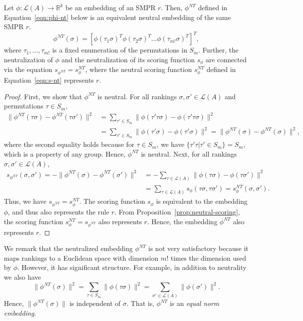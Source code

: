 \documentclass[prodmode,acmec]{ec-acmsmall}
\newcommand{\calL}{{\mathcal{L}}}
\newcommand{\rank}{{\calL(A)}}
\newcommand{\nt}{NT}
\begin{document}
\begin{lemma}
Let $\phi: \rank \to \mathbb{R}^k$ be an embedding of an SMPR $r$. Then, $\phi^{\nt}$ defined in Equation~\eqref{eqn:phi-nt} below is an equivalent neutral embedding of the same SMPR $r$. 
\begin{equation}
\phi^{\nt}(\sigma) = [\phi(\tau_1 \sigma)^T \phi(\tau_2 \sigma)^T \ldots \phi(\tau_{m!} \sigma)^T]^T,
\label{eqn:phi-nt}
\end{equation}
where $\tau_1,\ldots,\tau_{m!}$ is a fixed enumeration of the permutations in $S_m$. Further, the neutralization of $\phi$ and the neutralization of its scoring function $s_{\phi}$ are connected via the equation $s_{\phi^{\nt}} = s ^{\nt}_{\phi}$, where the neutral scoring function $s ^{\nt}_{\phi}$ defined in Equation~\eqref{eqn:s-nt} represents $r$. 
\label{lem:neutral-embedding}
\end{lemma}
\begin{proof}
First, we show that $\phi^{\nt}$ is neutral. For all rankings $\sigma,\sigma' \in \rank$ and permutations $\tau \in S_m$, 
\begin{align*}
\|\phi^{\nt}(\tau \sigma)-\phi^{\nt}(\tau \sigma')\|^2 &= \sum_{\tau' \in S_m} \|\phi(\tau' \tau \sigma)-\phi(\tau' \tau \sigma)\|^2 \\
&= \sum_{\tau' \in S_m} \|\phi(\tau' \sigma)-\phi(\tau' \sigma)\|^2 = \|\phi^{\nt}(\sigma)-\phi^{\nt}(\sigma)\|^2,
\end{align*}
where the second equality holds because for $\tau \in S_m$, we have $\{\tau' \tau | \tau' \in S_m\} = S_m$, which is a property of any group. Hence, $\phi^{\nt}$ is neutral. Next, for all rankings $\sigma,\sigma' \in \rank$, 
\begin{align*}
s_{\phi^{\nt}}(\sigma,\sigma') = -\|\phi^{\nt}(\sigma)-\phi^{\nt}(\sigma')\|^2 &= - \sum_{\tau \in \rank} \|\phi(\tau \sigma)-\phi(\tau \sigma')\|^2  \\
&= \sum_{\tau \in \rank} s_{\phi}(\tau \sigma,\tau \sigma') = s_{\phi}^{\nt}(\sigma,\sigma').
\end{align*}
Thus, we have $s_{\phi^{\nt}} = s_{\phi}^{\nt}$. The scoring function $s_{\phi}$ is equivalent to the embedding $\phi$, and thus also represents the rule $r$. From Proposition~\ref{prop:neutral-scoring}, the scoring function $s_{\phi}^{\nt} = s_{\phi^{\nt}}$ also represents $r$. Hence, the embedding $\phi^{\nt}$ also represents $r$. 
\end{proof}

We remark that the neutralized embedding $\phi^{\nt}$ is not very satisfactory because it maps rankings to a Euclidean space with dimension $m!$ times the dimension used by $\phi$. However, it has significant structure. For example, in addition to neutrality we also have 
$$
\|\phi^{\nt}(\sigma)\|^2 = \sum_{\tau \in S_m} \|\phi(\tau \sigma)\|^2 = \sum_{\sigma' \in \rank} \|\phi(\sigma')\|^2.
$$
Hence, $\|\phi^{\nt}(\sigma)\|$ is independent of $\sigma$. That is, $\phi^{\nt}$ is an \emph{equal norm embedding}.
\end{document}
